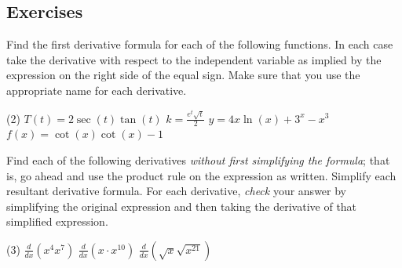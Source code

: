 \documentclass[12pt,]{book}
\theoremstyle{plain}
\theoremstyle{definition}
\numberwithin{equation}{section}
\newcommand{\fe}[2]{#1\mathopen{}\left(#2\right)\mathclose{}}
\newcommand{\lzoo}[2]{{\frac{d}{d#1}}{\left(#2\right)}}
\begin{document}
\subsection[Exercises]{Exercises}\label{exercises-37}
Find the first derivative formula for each of the following functions.  In each case take the derivative with respect to the independent variable as implied by the expression on the right side of the equal sign.  Make sure that you use the appropriate name for each derivative.%
\par
\begin{exercisegroup}(2)
\exercise[1.]\hypertarget{exercise-371}{\null}\(\fe{T}{t}=2\fe{\sec}{t}\fe{\tan}{t}\)%
\exercise[2.]\hypertarget{exercise-372}{\null}\(k=\frac{e^t\sqrt{t}}{2}\)%
\exercise[3.]\hypertarget{exercise-373}{\null}\(y=4x\fe{\ln}{x}+3^x-x^3\)%
\exercise[4.]\hypertarget{exercise-374}{\null}\(\fe{f}{x}=\fe{\cot}{x}\fe{\cot}{x}-1\)%
\end{exercisegroup}
\par\smallskip\noindent
Find each of the following derivatives \emph{without first simplifying the formula}; that is, go ahead and use the product rule on the expression as written. Simplify each resultant derivative formula.  For each derivative, \emph{check} your answer by simplifying the original expression and then taking the derivative of that simplified expression.%
\par
\begin{exercisegroup}(3)
\exercise[5.]\hypertarget{unsimplified-product-first}{\null}\(\lzoo{x}{x^4x^7}\)%
\exercise[6.]\hypertarget{exercise-376}{\null}\(\lzoo{x}{x\cdot x^{10}}\)%
\exercise[7.]\hypertarget{unsimplified-product-last}{\null}\(\lzoo{x}{\sqrt{x}\sqrt{x^{21}}}\)%
\end{exercisegroup}
\par\smallskip\noindent
\typeout{************************************************}
\typeout{************************************************}
\end{document}
